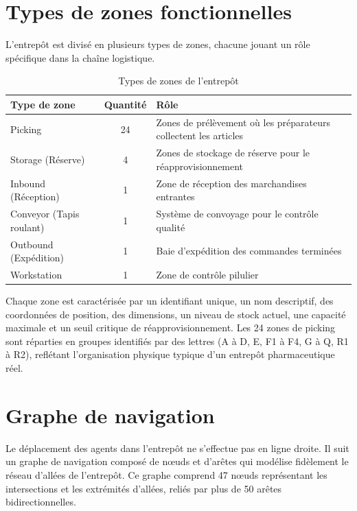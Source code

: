 \documentclass[12pt,a4paper]{report}
\begin{document}
\section{Types de zones fonctionnelles}

L'entrep\^ot est divis\'e en plusieurs types de zones, chacune jouant un r\^ole sp\'ecifique dans la cha\^ine logistique.

\begin{table}[H]
\centering
\caption{Types de zones de l'entrep\^ot}
\label{tab:zones}
\begin{tabularx}{\textwidth}{|l|c|X|}
\hline
\textbf{Type de zone} & \textbf{Quantit\'e} & \textbf{R\^ole} \\
\hline
Picking & 24 & Zones de pr\'el\`evement o\`u les pr\'eparateurs collectent les articles \\
\hline
Storage (R\'eserve) & 4 & Zones de stockage de r\'eserve pour le r\'eapprovisionnement \\
\hline
Inbound (R\'eception) & 1 & Zone de r\'eception des marchandises entrantes \\
\hline
Conveyor (Tapis roulant) & 1 & Syst\`eme de convoyage pour le contr\^ole qualit\'e \\
\hline
Outbound (Exp\'edition) & 1 & Baie d'exp\'edition des commandes termin\'ees \\
\hline
Workstation & 1 & Zone de contr\^ole pilulier \\
\hline
\end{tabularx}
\end{table}

Chaque zone est caract\'eris\'ee par un identifiant unique, un nom descriptif, des coordonn\'ees de position, des dimensions, un niveau de stock actuel, une capacit\'e maximale et un seuil critique de r\'eapprovisionnement. Les 24 zones de picking sont r\'eparties en groupes identifi\'es par des lettres (A \`a D, E, F1 \`a F4, G \`a Q, R1 \`a R2), refl\'etant l'organisation physique typique d'un entrep\^ot pharmaceutique r\'eel.

\section{Graphe de navigation}

Le d\'eplacement des agents dans l'entrep\^ot ne s'effectue pas en ligne droite. Il suit un graphe de navigation compos\'e de n\oe uds et d'ar\^etes qui mod\'elise fid\`element le r\'eseau d'all\'ees de l'entrep\^ot. Ce graphe comprend 47 n\oe uds repr\'esentant les intersections et les extr\'emit\'es d'all\'ees, reli\'es par plus de 50 ar\^etes bidirectionnelles.
\end{document}
